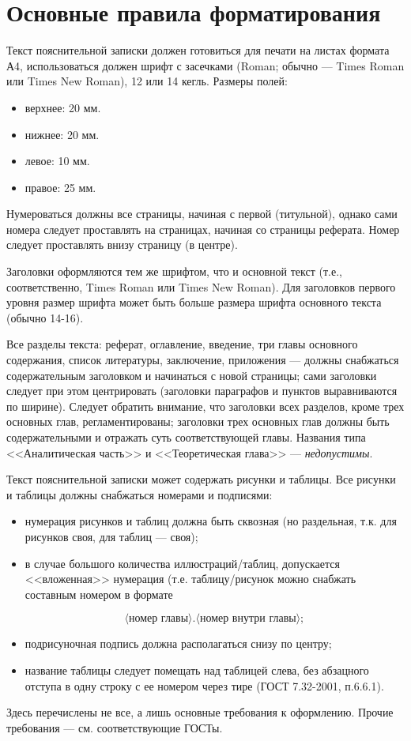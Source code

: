 ﻿\chapter{Основные правила форматирования}\label{app-format}

Текст пояснительной записки должен готовиться для печати на листах формата А4, использоваться должен шрифт с засечками (Roman; обычно --- Times Roman или Times New Roman), 12 или 14 кегль. Размеры полей:

\begin{itemize}
	\item верхнее: 20 мм.
	\item нижнее: 20 мм.
	\item левое: 10 мм.
	\item правое: 25 мм.
\end{itemize}

Нумероваться должны все страницы, начиная с первой (титульной), однако сами номера следует проставлять на страницах, начиная со страницы реферата. Номер следует проставлять внизу страницу (в центре).

Заголовки оформляются тем же шрифтом, что и основной текст (т.е., соответственно, Times Roman или Times New Roman). Для заголовков первого уровня размер шрифта может быть больше размера шрифта основного текста (обычно 14-16).

Все разделы текста: реферат, оглавление, введение, три главы основного
содержания, список литературы, заключение, приложения --- должны снабжаться
содержательным заголовком и начинаться с новой страницы; сами заголовки следует
при этом центрировать (заголовки параграфов и пунктов выравниваются по ширине).
Следует обратить внимание, что заголовки всех разделов, кроме трех основных
глав, регламентированы; заголовки трех основных глав должны быть содержательными
и отражать суть соответствующей главы. Названия типа <<Аналитическая часть>> и <<Теоретическая глава>> --- \textit{недопустимы}.

Текст пояснительной записки может содержать рисунки и таблицы. Все рисунки и
таблицы должны снабжаться номерами и подписями:

\begin{itemize}

	\item нумерация рисунков и таблиц должна быть сквозная (но раздельная, т.к. для рисунков своя, для таблиц --- своя);

	\item в случае большого количества иллюстраций/таблиц, допускается <<вложенная>> нумерация (т.е. таблицу/рисунок можно снабжать составным номером в формате 
	
	$$\langle\mbox{номер главы}\rangle.\langle\mbox{номер внутри главы}\rangle;$$
	
	\item подрисуночная подпись должна располагаться снизу по центру;
	
	\item название таблицы следует помещать над таблицей слева, без абзацного
	отступа в одну строку с ее номером через тире (ГОСТ 7.32-2001, п.6.6.1).

\end{itemize}

Здесь перечислены не все, а лишь основные требования к оформлению. Прочие
требования --- см. соответствующие ГОСТы.
